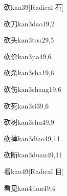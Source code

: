 \begin{verbete}{砍}{kan3}{9}[Radical 石]
\end{verbete}

\begin{verbete}{砍刀}{kan3dao1}{9,2}
\end{verbete}

\begin{verbete}{砍头}{kan3tou2}{9,5}
\end{verbete}

\begin{verbete}{砍价}{kan3jia4}{9,6}
\end{verbete}

\begin{verbete}{砍杀}{kan3sha1}{9,6}
\end{verbete}

\begin{verbete}{砍伤}{kan3shang1}{9,6}
\end{verbete}

\begin{verbete}{砍死}{kan3si3}{9,6}
\end{verbete}

\begin{verbete}{砍树}{kan3shu4}{9,9}
\end{verbete}

\begin{verbete}{砍掉}{kan3diao4}{9,11}
\end{verbete}

\begin{verbete}{砍断}{kan3duan4}{9,11}
\end{verbete}

\begin{verbete}{看}{kan4}{9}[Radical 目]
\end{verbete}

\begin{verbete}{看见}{kan4jian4}{9,4}
\end{verbete}

